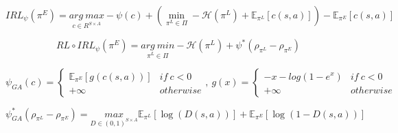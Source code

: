 \begin{equation}
    \label{formula:regularized_max_ent}
    IRL_{\psi}(\pi^{E}) = \underset{c \in R^{S \times A}}{arg \ max} - \psi(c) +  (\underset{\pi^{L} \in \Pi}{\min} -\mathcal{H}(\pi^{L}) + \mathbb{E}_{\pi^{L}} \left [ c(s,a) \right ]) - \mathbb{E}_{\pi^{E}} \left [ c(s,a) \right ]
\end{equation}

\begin{equation}
    \label{formula:policy_characterization}
    RL \circ IRL_{\psi}(\pi^{E}) = \underset{\pi^{L} \in \Pi}{arg \ min}-\mathcal{H}(\pi^{L}) + \psi^{*}(\rho_{\pi^{L}} - \rho_{\pi^{E}}) 
\end{equation}

\begin{equation}
    \label{formula:ga_regularization}
    \psi_{GA}(c) = \left\{\begin{matrix}
        \mathbb{E}_{\pi^{E}}\left [ g(c(s,a)) \right ] &  if \ c < 0\\ 
        + \infty & otherwise
        \end{matrix}\right., \  g(x) = \left\{\begin{matrix}
                        -x - log(1- e^{x}) &  if \ c < 0\\ 
                        + \infty & otherwise
                        \end{matrix}\right.
\end{equation}

\begin{equation}
    \label{formula:ga_regularizer_conjugate}
    \psi^{*}_{GA}(\rho_{\pi^{L}} - \rho_{\pi^{E}}) = \underset{D\in(0,1)^{S \times A}}{max} \mathbb{E}_{\pi^{L}}\left [ \log(D(s,a))\right ] +\mathbb{E}_{\pi^{E}}\left [ \log(1 - D(s,a))\right ]
\end{equation}